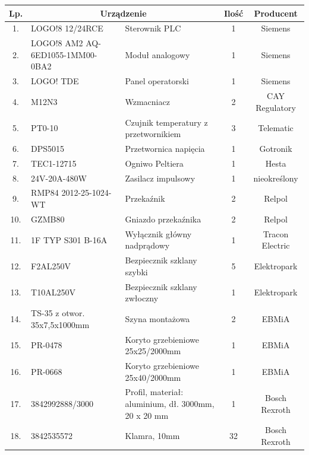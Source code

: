 \documentclass[oneside]{mgr}
\begin{document}
\begin{table}[h!]
\footnotesize
\begin{tabularx}{\textwidth}{|c|X|X|c|c|}
\hline
\rowcolor{lightgray}
    Lp. & \multicolumn{2}{|c|}{Urządzenie}        & Ilość          & Producent                                    \\\hline
    1.      &LOGO!8 12/24RCE     &Sterownik PLC      &1       &Siemens\\\hline
    2.      &LOGO!8 AM2 AQ-6ED1055-1MM00-0BA2    &Moduł analogowy      &1       &Siemens\\\hline
    3.      &LOGO! TDE    &Panel operatorski      &1       &Siemens\\\hline
    4.      &M12N3    &Wzmacniacz      &2       &CAY Regulatory\\\hline
    5.      &PT0-10    &Czujnik temperatury z przetwornikiem      &3       &Telematic\\\hline
    6.      &DPS5015    &Przetwornica napięcia      &1       &Gotronik\\\hline
    7.      &TEC1-12715    &Ogniwo Peltiera      &1       &Hesta\\\hline
    8.      &24V-20A-480W     &Zasilacz impulsowy     &1       & 	nieokreślony\\\hline
    9.      &RMP84 2012-25-1024-WT      &Przekaźnik     &2       &Relpol\\\hline
    10.      &GZMB80      &Gniazdo przekaźnika     &2       &Relpol\\\hline
    11.      &1F TYP S301 B-16A     &Wyłącznik główny nadprądowy     &1       &Tracon Electric\\\hline
    12.      &F2AL250V      &Bezpiecznik szklany szybki     &5       &Elektropark\\\hline
    13.      &T10AL250V      &Bezpiecznik szklany zwłoczny     &1      &Elektropark\\\hline
    14.      &TS-35 z otwor. 35x7,5x1000mm      &Szyna montażowa     &2      &EBMiA\\\hline
    15.      &PR-0478     &Koryto grzebieniowe 25x25/2000mm     &1      &EBMiA\\\hline
    16.      &PR-0668    &Koryto grzebieniowe 25x40/2000mm     &1      &EBMiA\\\hline
    17.      &3842992888/3000    &Profil, materiał: aluminium, dł. 3000mm, 20 x 20 mm   &1      &Bosch Rexroth\\\hline
    18.      &3842535572   &Klamra, 10mm     &32      &Bosch Rexroth\\\hline

\end{tabularx}
\end{table}
\end{document}
